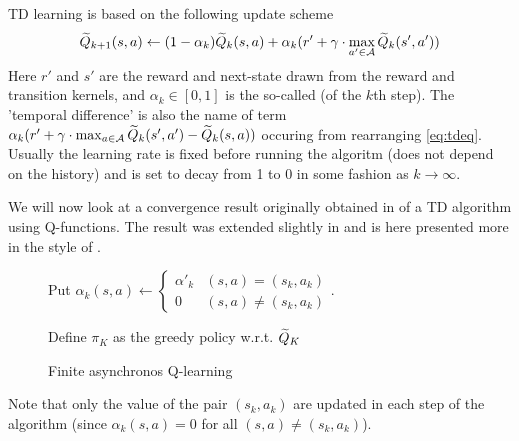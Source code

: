 TD learning is based on the following
update scheme
\begin{equation}
  \widetilde{Q}_{k+1}(s, a) \leftarrow (1-\alpha_k) \widetilde{Q}_k(s, a)
  + \alpha_k (r' + \gamma \cdot \max_{a' \in \mathcal{A}} \widetilde{Q}_k(s', a'))
  \label{eq:tdeq}
\end{equation}
Here $r'$ and $s'$ are the reward and next-state drawn from the
reward and transition kernels,
and $\alpha_k \in [0,1]$ is the so-called 
(of the $k$th step).
The 'temporal difference' is also the name of term
$ \alpha_k ( r' + \gamma \cdot \max_{a \in \mathcal{A}} \widetilde{Q}_k(s', a')
- \widetilde{Q}_k(s, a) )$ occuring from rearranging \cref{eq:tdeq}.
Usually the learning rate is fixed before running the algoritm
(does not depend on the history) and is set to decay
from 1 to 0 in some fashion as $k \to \infty$.

We will now look at a convergence result originally obtained in
 of a TD algorithm using Q-functions.
The result was extended slightly in  and is here presented
more in the style of .
\begin{figure}[H]
\begin{algorithm}[H] %
  \caption{Finite asynchronos Q-learning}
  Put $\alpha_k(s, a) \leftarrow \begin{cases}
    \alpha'_k & (s, a) = (s_k, a_k)
    \\ 0 & (s, a) \neq (s_k, a_k)
  \end{cases}$.

  Define $\pi_K$ as the greedy policy w.r.t. $\widetilde{Q}_K$ \\
  \label{alg:finAsyncQL}
\end{algorithm}
\end{figure}
Note that only the value of the pair $(s_k, a_k)$ are updated in each
step of the algorithm
(since $\alpha_k(s, a) = 0$ for all $(s,a)\neq(s_k, a_k)$).

